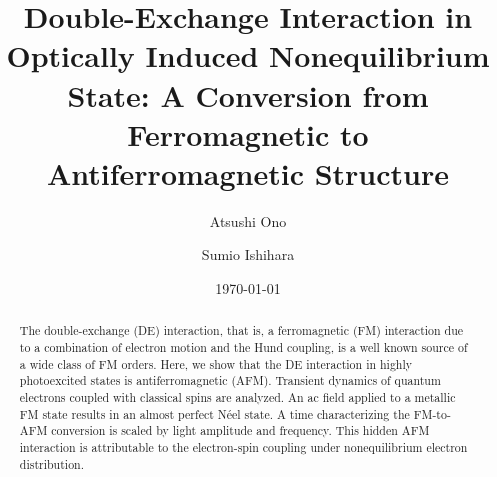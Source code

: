 \documentclass[aps,twocolumn,showpacs,prl,amsmath,amssymb]{revtex4-1}
\begin{document}
\title{Double-Exchange Interaction in Optically Induced Nonequilibrium State: A Conversion from Ferromagnetic to Antiferromagnetic Structure} 
\author{Atsushi Ono}
\author{Sumio Ishihara}
\date{\today}
\begin{abstract}
The double-exchange (DE) interaction, that is, a ferromagnetic (FM) interaction due to a combination of electron motion and the Hund coupling, is a well known source of a wide class of FM orders. 
Here, we show that the DE interaction in highly photoexcited states is antiferromagnetic (AFM).
Transient dynamics of quantum electrons coupled with classical spins are analyzed. 
An ac field applied to a metallic FM state results in an almost perfect N\'eel state. 
A time characterizing the FM-to-AFM conversion is scaled by light amplitude and frequency. 
This hidden AFM interaction is attributable to the electron-spin coupling under nonequilibrium electron distribution. 
\end{abstract}


\maketitle
\narrowtext



%
%

%



\end{document}
